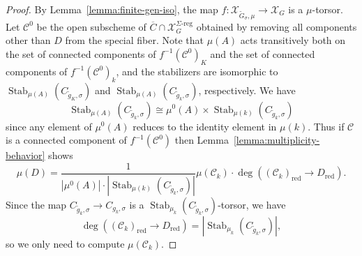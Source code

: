 \documentclass[11pt,reqno]{amsart}
\theoremstyle{definition}
\renewcommand{\rm}{\mathrm}
\newcommand{\sC}{{\mathscr C}}
\newcommand{\sX}{{\mathscr X}}
\DeclareMathOperator{\Stab}{Stab}
\newcommand{\ov}[1]{\overline{#1}}
\begin{document}
\begin{proof}
    By Lemma~\ref{lemma:finite-gen-iso}, the map $f\colon \sX_{\widetilde{G}_\sigma, \mu} \to \sX_G$ is a $\mu$-torsor. Let $\sC^0$ be the open subscheme of $\ov{C} \cap \sX_G^{\Sigma\textrm{-reg}}$ obtained by removing all components other than $D$ from the special fiber. Note that $\mu(A)$ acts transitively both on the set of connected components of $f^{-1}(\sC^0)_K$ and the set of connected components of $f^{-1}(\sC^0)_k$, and the stabilizers are isomorphic to $\Stab_{\mu(A)}(C_{\widetilde{g}_K,\sigma})$ and $\Stab_{\mu(A)}(C_{\widetilde{g}_k,\sigma})$, respectively. We have
    \[
    \Stab_{\mu(A)}(C_{\widetilde{g}_k,\sigma}) \cong \mu^0(A) \times \Stab_{\mu(k)}(C_{\widetilde{g}_k,\sigma})
    \]
    since any element of $\mu^0(A)$ reduces to the identity element in $\mu(k)$. Thus if $\sC$ is a connected component of $f^{-1}(\sC^0)$ then Lemma~\ref{lemma:multiplicity-behavior} shows
    \begin{equation}\label{eqn:mu-1}
    \mu(D) = \frac{1}{|\mu^0(A)| \cdot |\Stab_{\mu(k)}(C_{\widetilde{g}_k,\sigma})|}\mu(\sC_k) \cdot \deg((\sC_k)_{\rm{red}} \to D_{\rm{red}}).
    \end{equation}
    Since the map $C_{\widetilde{g}_k,\sigma} \to C_{g_k,\sigma}$ is a $\Stab_{\mu_k}(C_{\widetilde{g}_k,\sigma})$-torsor, we have
    \begin{equation}\label{eqn:mu-2}
    \deg((\sC_k)_{\rm{red}} \to D_{\rm{red}}) = |\Stab_{\mu_k}(C_{\widetilde{g}_k,\sigma})|,
    \end{equation}
    so we only need to compute $\mu(\sC_k)$.


\end{proof}
\end{document}
